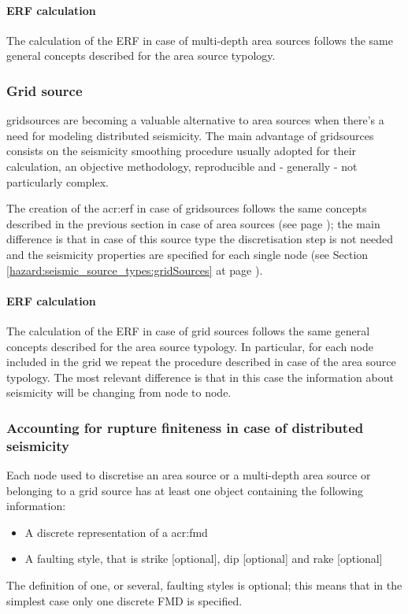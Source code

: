 \paragraph{ERF calculation}
The calculation of the ERF in case of multi-depth area sources follows
the same general concepts described for the area source typology.
%
\subsubsection{Grid source}
\Glspl{gridsource} are becoming a valuable alternative
to area sources when there's a need for modeling distributed 
seismicity. 
%
The main advantage of \glspl{gridsource} consists on the seismicity 
smoothing procedure usually adopted for their calculation, an 
objective methodology, reproducible and - generally - not particularly 
complex. 

The creation of the \gls{acr:erf} in case of \glspl{gridsource} follows 
the same concepts described in the previous section in case of area 
sources (see page \pageref{sec:areasource}); the main difference is that 
in case of this source type the discretisation step is not needed and 
the seismicity properties are specified for each single node (see Section
\ref{hazard:seismic_source_types:gridSources} at page 
\pageref{hazard:seismic_source_types:gridSources}).
%
\paragraph{ERF calculation}
The calculation of the ERF in case of grid sources follows the same 
general concepts described for the area source typology.
In particular, for each node included in the grid we repeat the procedure
described in case of the area source typology. 
The most relevant difference is that in this case the information about 
seismicity will be changing from node to node.
%
\subsubsection{Accounting for rupture finiteness in case of distributed 
seismicity}
%
Each node used to discretise an area source or a multi-depth area 
source or belonging to a grid source has at least one object containing 
the following information:
\begin{itemize}
\item A discrete representation of a \gls{acr:fmd} 
\item A faulting style, that is strike [optional], dip [optional] and 
rake [optional] 
\end{itemize}
The definition of one, or several, faulting styles is optional; this 
means that in the simplest case only one discrete FMD is specified.


